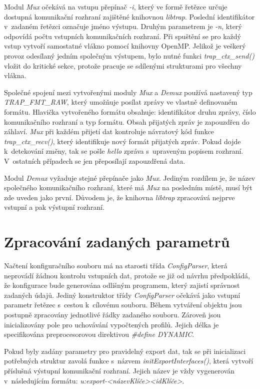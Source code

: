  Modul \textit{Mux} očekává na vstupu přepínač \textit{-i}, který ve formě řetězce určuje dostupná 
 komunikační rozhraní 
 zajištěné knihovnou \textit{libtrap}. Poslední identifikátor v~zadaném řetězci označuje jméno 
 výstupu. Druhým parametrem je \textit{-n}, který odpovídá počtu vstupních komunikačních
 rozhraní. Při spuštění 
 se pro každý vstup vytvoří samostatné vlákno pomocí knihovny OpenMP. Jelikož je veškerý provoz 
 odesílaný jedním společným výstupem, bylo nutné funkci \textit{trap\_ctx\_send()} vložit do
 kritické sekce, 
 protože pracuje se sdílenými strukturami pro všechny vlákna.
 
 Společné spojení mezi vytvořenými moduly \textit{Mux} a \textit{Demux} používá nastavený typ
 \textit{TRAP\_FMT\_RAW},
 který umožňuje posílat zprávy ve vlastně definovaném formátu. Hlavička vytvořeného formátu
 obsahuje: identifikátor druhu zprávy, číslo komunikačního rozhraní a typ formátu. Obsah přijatých zpráv
 je zapouzdřen do záhlaví. \textit{Mux} při každém přijetí dat kontroluje návratový
 kód funkce \textit{trap\_ctx\_recv()}, který identifikuje nový formát přijatých zpráv. Pokud
 dojde k~detekování změny, tak se pošle \textit{hello} zpráva s~upraveným popisem rozhraní.
 V~ostatních případech se jen přeposílají zapouzdřená data.
 
 Modul \textit{Demux} vyžaduje stejné přepínače jako \textit{Mux}. Jediným rozdílem je, že 
 název společného komunikačního rozhraní, které má \textit{Mux} na posledním místě, musí být zde uveden 
 jako první. Důvodem je, že knihovna \textit{libtrap} zpracovává nejprve vstupní a pak
 výstupní rozhraní. 
 
\section{Zpracování zadaných parametrů}

Načtení konfiguračního souboru má na starosti třída \textit{ConfigParser}, která neprovádí 
žádnou kontrolu vstupních dat, protože se již od návrhu předpokládá, že konfigurace bude 
generována odlišným programem, který zajistí správnost zadaných údajů. Jediný konstruktor třídy
 \textit{ConfigParser} očekává jako vstupní parametr řetězec s~cestou k~cílovému souboru. Během vytváření
 objektu jsou postupně zpracovány jednotlivé řádky zadaného souboru. Zároveň jsou inicializovány
 pole pro uchovávání vypočtených profilů. Jejich délka je specifikována preprocesorovou direktivou
 \textit{\#define DYNAMIC}.
 
Pokud byly zadány parametry pro pravidelný export dat, tak se při inicializaci potřebných struktur
zavolá funkce s~názvem \textit{initExportInterfaces()}, která vytvoří příslušná výstupní komunikační 
rozhraní. Jejich název je vždy vygenerován v~následujícím formátu: 
\textit{u:export-<názevKlíče><idKlíče>}.
   
